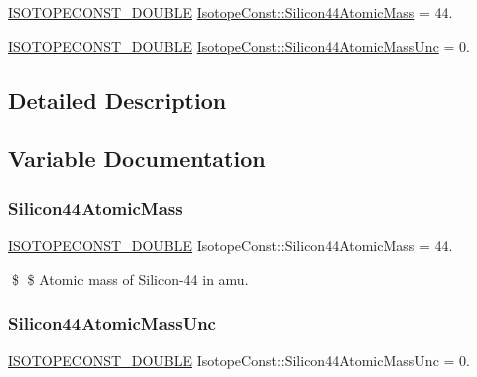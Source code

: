 \begin{DoxyCompactItemize}
\item 
\mbox{\hyperlink{group___isotope_const-_macros_ga8f45a7272ce02c0b4c65c44636ed719a}{I\+S\+O\+T\+O\+P\+E\+C\+O\+N\+S\+T\+\_\+\+D\+O\+U\+B\+LE}} \mbox{\hyperlink{group___isotope_const-_silicon-_si44_ga941b410791c1a8afabc696919ddb670b}{Isotope\+Const\+::\+Silicon44\+Atomic\+Mass}} = 44.
\item 
\mbox{\hyperlink{group___isotope_const-_macros_ga8f45a7272ce02c0b4c65c44636ed719a}{I\+S\+O\+T\+O\+P\+E\+C\+O\+N\+S\+T\+\_\+\+D\+O\+U\+B\+LE}} \mbox{\hyperlink{group___isotope_const-_silicon-_si44_gaffe6db94115393c4c70c7b76e5b1fb2b}{Isotope\+Const\+::\+Silicon44\+Atomic\+Mass\+Unc}} = 0.
\end{DoxyCompactItemize}


\subsection{Detailed Description}


\subsection{Variable Documentation}
\mbox{\label{group___isotope_const-_silicon-_si44_ga941b410791c1a8afabc696919ddb670b}} 
\subsubsection{\texorpdfstring{Silicon44\+Atomic\+Mass}{Silicon44AtomicMass}}
{\footnotesize\ttfamily \mbox{\hyperlink{group___isotope_const-_macros_ga8f45a7272ce02c0b4c65c44636ed719a}{I\+S\+O\+T\+O\+P\+E\+C\+O\+N\+S\+T\+\_\+\+D\+O\+U\+B\+LE}} Isotope\+Const\+::\+Silicon44\+Atomic\+Mass = 44.}

\$ \$ Atomic mass of Silicon-\/44 in amu. \mbox{\label{group___isotope_const-_silicon-_si44_gaffe6db94115393c4c70c7b76e5b1fb2b}} 
\subsubsection{\texorpdfstring{Silicon44\+Atomic\+Mass\+Unc}{Silicon44AtomicMassUnc}}
{\footnotesize\ttfamily \mbox{\hyperlink{group___isotope_const-_macros_ga8f45a7272ce02c0b4c65c44636ed719a}{I\+S\+O\+T\+O\+P\+E\+C\+O\+N\+S\+T\+\_\+\+D\+O\+U\+B\+LE}} Isotope\+Const\+::\+Silicon44\+Atomic\+Mass\+Unc = 0.}

